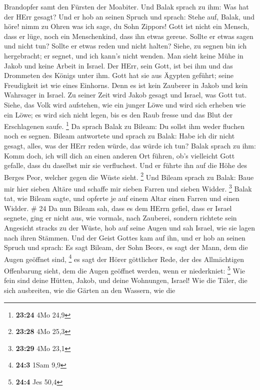 Brandopfer samt den Fürsten der Moabiter. Und Balak sprach zu ihm: Was
hat der HErr gesagt?  Und er hob an seinen Spruch und
sprach: Stehe auf, Balak, und höre! nimm zu Ohren was ich sage, du Sohn
Zippors!  Gott ist nicht ein Mensch, dass er lüge, noch ein
Menschenkind, dass ihn etwas gereue. Sollte er etwas sagen und nicht
tun? Sollte er etwas reden und nicht halten?  Siehe, zu
segnen bin ich hergebracht; er segnet, und ich kann's nicht wenden.
 Man sieht keine Mühe in Jakob und keine Arbeit in Israel.
Der HErr, sein Gott, ist bei ihm und das Drommeten des Königs unter ihm.
 Gott hat sie aus Ägypten geführt; seine Freudigkeit ist
wie eines Einhorns.  Denn es ist kein Zauberer in Jakob und
kein Wahrsager in Israel. Zu seiner Zeit wird Jakob gesagt und Israel,
was Gott tut.  Siehe, das Volk wird aufstehen, wie ein
junger Löwe und wird sich erheben wie ein Löwe; es wird sich nicht
legen, bis es den Raub fresse und das Blut der Erschlagenen saufe.
\footnote{\textbf{23:24} 4Mo 24,9}  Da sprach Balak zu
Bileam: Du sollst ihm weder fluchen noch es segnen.  Bileam
antwortete und sprach zu Balak: Habe ich dir nicht gesagt, alles, was
der HErr reden würde, das würde ich tun?  Balak sprach zu
ihm: Komm doch, ich will dich an einen anderen Ort führen, ob's
vielleicht Gott gefalle, dass du daselbst mir sie verfluchest.
 Und er führte ihn auf die Höhe des Berges Peor, welcher
gegen die Wüste sieht. \footnote{\textbf{23:28} 4Mo 25,3} 
Und Bileam sprach zu Balak: Baue mir hier sieben Altäre und schaffe mir
sieben Farren und sieben Widder. \footnote{\textbf{23:29} 4Mo 23,1}
 Balak tat, wie Bileam sagte, und opferte je auf einem
Altar einen Farren und einen Widder. \# 24  Da nun Bileam
sah, dass es dem HErrn gefiel, dass er Israel segnete, ging er nicht
aus, wie vormals, nach Zauberei, sondern richtete sein Angesicht stracks
zu der Wüste,  hob auf seine Augen und sah Israel, wie sie
lagen nach ihren Stämmen. Und der Geist Gottes kam auf ihn, 
und er hob an seinen Spruch und sprach: Es sagt Bileam, der Sohn Beors,
es sagt der Mann, dem die Augen geöffnet sind, \footnote{\textbf{24:3}
  1Sam 9,9}  es sagt der Hörer göttlicher Rede, der des
Allmächtigen Offenbarung sieht, dem die Augen geöffnet werden, wenn er
niederkniet: \footnote{\textbf{24:4} Jes 50,4}  Wie fein
sind deine Hütten, Jakob, und deine Wohnungen, Israel!  Wie
die Täler, die sich ausbreiten, wie die Gärten an den Wassern, wie die
